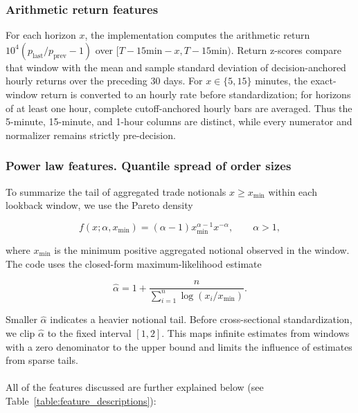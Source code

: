 \documentclass{ieeeaccess}
\begin{document}
\subsubsection{Arithmetic return features}

For each horizon $x$, the implementation computes the arithmetic return $10^4(p_{\mathrm{last}}/p_{\mathrm{prev}}-1)$ over $[T-15\text{min}-x,T-15\text{min})$. Return z-scores compare that window with the mean and sample standard deviation of decision-anchored hourly returns over the preceding 30 days. For $x\in\{5,15\}$ minutes, the exact-window return is converted to an hourly rate before standardization; for horizons of at least one hour, complete cutoff-anchored hourly bars are averaged. Thus the 5-minute, 15-minute, and 1-hour columns are distinct, while every numerator and normalizer remains strictly pre-decision.

\subsubsection{Power law features. Quantile spread of order sizes}

To summarize the tail of aggregated trade notionals $x\geq x_{\min}$ within each lookback window, we use the Pareto density

\begin{equation}
    f(x;\alpha,x_{\min})=(\alpha-1)x_{\min}^{\alpha-1}x^{-\alpha}, \qquad \alpha>1,
    \label{eq:powerlaw_pdf}
\end{equation}

where $x_{\min}$ is the minimum positive aggregated notional observed in the window. The code uses the closed-form maximum-likelihood estimate

\begin{equation}
    \hat{\alpha}=1+\frac{n}{\sum_{i=1}^{n}\log(x_i/x_{\min})}.
    \label{eq:powerlaw_ols}
\end{equation}

Smaller $\hat{\alpha}$ indicates a heavier notional tail. Before cross-sectional standardization, we clip $\hat{\alpha}$ to the fixed interval $[1,2]$. This maps infinite estimates from windows with a zero denominator to the upper bound and limits the influence of estimates from sparse tails.
\\ \\
All of the features discussed are further explained below (see Table~\ref{table:feature_descriptions}):
\end{document}
